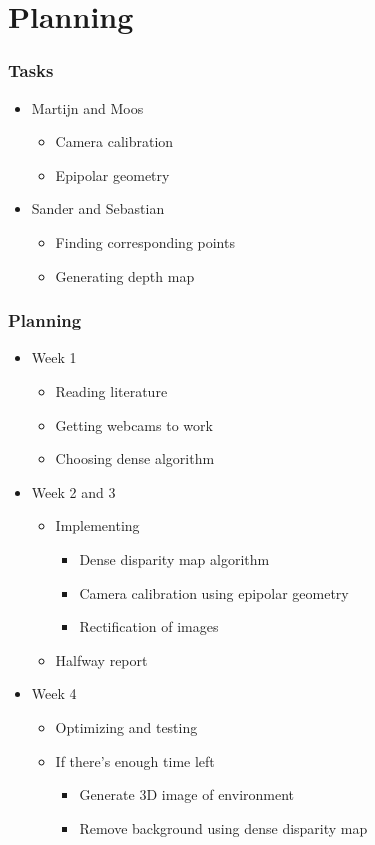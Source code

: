 \documentclass{article}
\begin{document}
\section{Planning}


  \frametitle{Tasks}
  \begin{itemize}
    \item Martijn and Moos
    \begin{itemize}
      \item Camera calibration
      \item Epipolar geometry
    \end{itemize}
    \item Sander and Sebastian
    \begin{itemize}
      \item Finding corresponding points
      \item Generating depth map
    \end{itemize}
  \end{itemize}


  \frametitle{Planning}
  \begin{itemize}
    \item Week 1
      \begin{itemize}
        \item Reading literature
        \item Getting webcams to work
        \item Choosing dense algorithm
      \end{itemize}
    \item Week 2 and 3
      \begin{itemize}
        \item Implementing
          \begin{itemize}
            \item Dense disparity map algorithm
            \item Camera calibration using epipolar geometry
            \item Rectification of images
          \end{itemize}
        \item Halfway report
      \end{itemize}
    \item Week 4
      \begin{itemize}
        \item Optimizing and testing
        \item If there's enough time left
          \begin{itemize}
            \item Generate 3D image of environment
            \item Remove background using dense disparity map
          \end{itemize}
      \end{itemize}
  \end{itemize}
\end{document}

